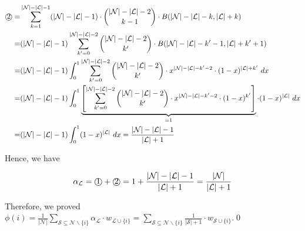 \begin{small}
\begin{align*}
\text{\textcircled{2}} =& \sum_{k=1}^{|\mathcal{N}|-|\mathcal{L}|-1} (|\mathcal{N}|-|\mathcal{L}|-1)\cdot \binom{|\mathcal{N}|-|\mathcal{L}|-2}{k-1} \cdot B(|\mathcal{N}|-|\mathcal{L}|-k, |\mathcal{L}|+k)\\
=& (|\mathcal{N}|-|\mathcal{L}|-1)\sum_{k'=0}^{|\mathcal{N}|-|\mathcal{L}|-2} \binom{|\mathcal{N}|-|\mathcal{L}|-2}{k'}\cdot B(|\mathcal{N}|-|\mathcal{L}|-k'-1, |\mathcal{L}|+k'+1)\\
=& (|\mathcal{N}|-|\mathcal{L}|-1)\int_{0}^{1} \sum_{k'=0}^{|\mathcal{N}|-|\mathcal{L}|-2}\binom{|\mathcal{N}|-|\mathcal{L}|-2}{k'}\cdot x^{|\mathcal{N}|-|\mathcal{L}|-k'-2}\cdot (1-x)^{|\mathcal{L}|+k'}\ dx\\
=& (|\mathcal{N}|-|\mathcal{L}|-1)\int_{0}^{1} \underbrace{\left[\sum_{k'=0}^{|\mathcal{N}|-|\mathcal{L}|-2}\binom{|\mathcal{N}|-|\mathcal{L}|-2}{k'}\cdot x^{|\mathcal{N}|-|\mathcal{L}|-k'-2}\cdot (1-x)^{k'}\right]}_{=1}\cdot (1-x)^{|\mathcal{L}|}\ dx\\
=& (|\mathcal{N}|-|\mathcal{L}|-1)\int_0^1 (1-x)^{|\mathcal{L}|}\ dx = \frac{|\mathcal{N}|-|\mathcal{L}|-1}{|\mathcal{L}|+1}
\end{align*}
\end{small}

Hence, we have 


\begin{small}
\begin{equation*}
    \alpha_\mathcal{L}=\text{\textcircled{1}}+\text{\textcircled{2}}=1+\frac{|\mathcal{N}|-|\mathcal{L}|-1}{|\mathcal{L}|+1}=\frac{|\mathcal{N}|}{|\mathcal{L}|+1}
\end{equation*}
\end{small}


Therefore, we proved {\small$\phi(i)=\frac{1}{|\mathcal{N}|}\sum_{\mathcal{S}\subseteq \mathcal{N}\backslash\{i\}}\alpha_\mathcal{L}\cdot  w_{\mathcal{L}\cup\{i\}} =\sum_{\mathcal{S}\subseteq \mathcal{N}\backslash\{i\}}\frac{1}{|\mathcal{S}|+1}\cdot w_{\mathcal{S}\cup\{i\}}$}.\qed


